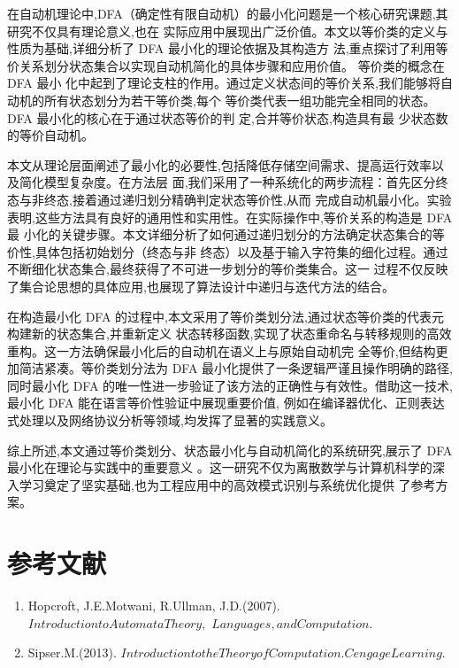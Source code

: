\documentclass{article}
\begin{document}
在自动机理论中,DFA（确定性有限自动机）的最小化问题是一个核心研究课题,其研究不仅具有理论意义,也在
实际应用中展现出广泛价值。本文以等价类的定义与性质为基础,详细分析了 DFA 最小化的理论依据及其构造方
法,重点探讨了利用等价关系划分状态集合以实现自动机简化的具体步骤和应用价值。 等价类的概念在 DFA 最小
化中起到了理论支柱的作用。通过定义状态间的等价关系,我们能够将自动机的所有状态划分为若干等价类,每个
等价类代表一组功能完全相同的状态。DFA 最小化的核心在于通过状态等价的判 定,合并等价状态,构造具有最
少状态数的等价自动机。
   
   本文从理论层面阐述了最小化的必要性,包括降低存储空间需求、提高运行效率以及简化模型复杂度。在方法层
   面,我们采用了一种系统化的两步流程：首先区分终态与非终态,接着通过递归划分精确判定状态等价性,从而
   完成自动机最小化。实验表明,这些方法具有良好的通用性和实用性。在实际操作中,等价关系的构造是 DFA 最
   小化的关键步骤。本文详细分析了如何通过递归划分的方法确定状态集合的等价性,具体包括初始划分（终态与非
   终态）以及基于输入字符集的细化过程。通过不断细化状态集合,最终获得了不可进一步划分的等价类集合。这一
   过程不仅反映了集合论思想的具体应用,也展现了算法设计中递归与迭代方法的结合。

   在构造最小化 DFA 的过程中,本文采用了等价类划分法,通过状态等价类的代表元构建新的状态集合,并重新定义
   状态转移函数,实现了状态重命名与转移规则的高效重构。这一方法确保最小化后的自动机在语义上与原始自动机完
   全等价,但结构更加简洁紧凑。等价类划分法为 DFA 最小化提供了一条逻辑严谨且操作明确的路径,同时最小化 DFA
   的唯一性进一步验证了该方法的正确性与有效性。借助这一技术,最小化 DFA 能在语言等价性验证中展现重要价值,
   例如在编译器优化、正则表达式处理以及网络协议分析等领域,均发挥了显著的实践意义。

综上所述,本文通过等价类划分、状态最小化与自动机简化的系统研究,展示了 DFA 最小化在理论与实践中的重要意义
。这一研究不仅为离散数学与计算机科学的深入学习奠定了坚实基础,也为工程应用中的高效模式识别与系统优化提供
了参考方案。


\newpage
\section{参考文献}
\begin{enumerate}
    \item Hopcroft, J.E.Motwani, R.Ullman, J.D.(2007). $Introduction to Automata Theory,$ \newline$Languages, and Computation.$
    \item Sipser.M.(2013). $Introduction to the Theory of Computation. Cengage Learning.$
\end{enumerate}
\end{document}
